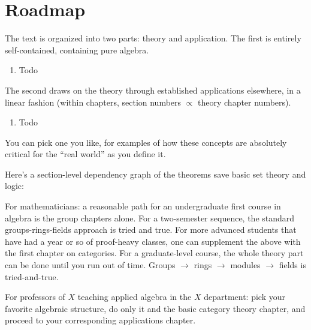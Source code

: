 \documentclass{book}
\begin{document}
\chapter{Roadmap}
The text is organized into two parts: theory and application.
The first is entirely self-contained, containing pure algebra.
\begin{enumerate}
\item Todo
\end{enumerate}
The second draws on the theory through established applications elsewhere, in a linear fashion
(within chapters, section numbers $\propto$ theory chapter numbers).
\begin{enumerate}
\item Todo
\end{enumerate}
You can pick one you like, for examples of how these concepts are absolutely critical for the ``real world'' as you define it.

Here's a section-level dependency graph of the theorems save basic set theory and logic:

For mathematicians: a reasonable path for an undergraduate first course in algebra is the group chapters alone.
For a two-semester sequence, the standard groups-rings-fields approach is tried and true.
For more advanced students that have had a year or so of proof-heavy classes, one can supplement the above with the first chapter on categories.
For a graduate-level course, the whole theory part can be done until you run out of time.
Groups $\to$ rings $\to$ modules $\to$ fields is tried-and-true.

For professors of $X$ teaching applied algebra in the $X$ department: pick your favorite algebraic structure, do only it and the basic category theory chapter, and proceed to your corresponding applications chapter.

\tableofcontents
\end{document}
